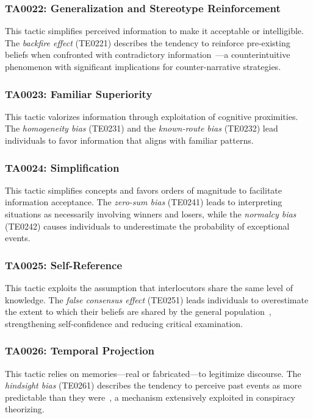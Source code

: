 \documentclass[11pt,a4paper]{article}
\begin{document}
\subsubsection{TA0022: Generalization and Stereotype Reinforcement}
This tactic simplifies perceived information to make it acceptable or intelligible. The \textit{backfire effect} (TE0221) describes the tendency to reinforce pre-existing beliefs when confronted with contradictory information~\cite{nyhan2010}---a counterintuitive phenomenon with significant implications for counter-narrative strategies.

\subsubsection{TA0023: Familiar Superiority}
This tactic valorizes information through exploitation of cognitive proximities. The \textit{homogeneity bias} (TE0231) and the \textit{known-route bias} (TE0232) lead individuals to favor information that aligns with familiar patterns.

\subsubsection{TA0024: Simplification}
This tactic simplifies concepts and favors orders of magnitude to facilitate information acceptance. The \textit{zero-sum bias} (TE0241) leads to interpreting situations as necessarily involving winners and losers, while the \textit{normalcy bias} (TE0242) causes individuals to underestimate the probability of exceptional events.

\subsubsection{TA0025: Self-Reference}
This tactic exploits the assumption that interlocutors share the same level of knowledge. The \textit{false consensus effect} (TE0251) leads individuals to overestimate the extent to which their beliefs are shared by the general population~\cite{ross1977}, strengthening self-confidence and reducing critical examination.

\subsubsection{TA0026: Temporal Projection}
This tactic relies on memories---real or fabricated---to legitimize discourse. The \textit{hindsight bias} (TE0261) describes the tendency to perceive past events as more predictable than they were~\cite{fischhoff1975}, a mechanism extensively exploited in conspiracy theorizing.
\end{document}
